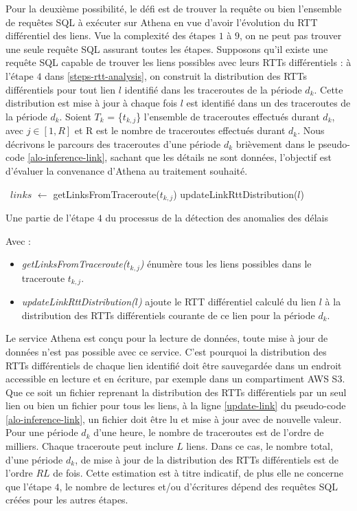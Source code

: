 Pour la deuxième possibilité, le défi est de trouver la requête ou bien l'ensemble de requêtes SQL à exécuter sur Athena en vue d'avoir l'évolution du RTT différentiel des liens. 
Vue la complexité des  étapes $1$ à $9$, on ne peut pas trouver une seule requête SQL assurant toutes les étapes. Supposons qu'il existe une requête SQL capable de trouver les liens possibles avec leurs RTTs différentiels : à l'étape $ 4 $ dans \ref{steps-rtt-analysis}, on construit la distribution des RTTs différentiels pour tout lien $l$ identifié dans les traceroutes de la période $d_k$. Cette distribution est mise à jour à chaque fois $l$ est identifié dans un des traceroutes  de la période $d_k$. Soient  $T_k$ = \{$t_{k, j}$\}  l'ensemble de traceroutes effectués durant $d_k$, avec $j \in [1, R]$ et R est le nombre de traceroutes effectués durant $d_k$. Nous décrivons le parcours des traceroutes d'une période $d_k$ brièvement dans le pseudo-code \ref{alo-inference-link}, sachant que les détails ne sont données, l'objectif est d'évaluer la convenance d'Athena au traitement souhaité.
\begin{algorithm}[H]
\begin{algorithmic}[1]
	  \
	  \State $links$ $\leftarrow$ getLinksFromTraceroute($t_{k, j}$)
	  	 		\State updateLinkRttDistribution($l$) \label{update-link}
	  	 \EndFor
	 \EndFor
\end{algorithmic}
\caption{Une partie de l'étape $4$ du processus de la détection des anomalies des délais }
\label{alo-inference-link}
\end{algorithm}

Avec : 
\begin{itemize}
	\item \textit{getLinksFromTraceroute($t_{k, j}$)} énumère tous les liens possibles dans le traceroute $t_{k, j}$.

    \item \textit{updateLinkRttDistribution($l$)} ajoute le RTT différentiel calculé du lien $l$ à la distribution des RTTs différentiels courante de ce lien pour la période $d_k$.
\end{itemize}


Le service Athena est conçu pour la lecture de données, toute mise à jour de données n'est pas possible avec ce service. C'est pourquoi la distribution des RTTs différentiels de chaque  lien identifié doit être sauvegardée dans un endroit accessible en lecture et en écriture, par exemple dans un compartiment AWS S3. Que ce soit un fichier reprenant la distribution des RTTs différentiels  par un seul lien ou bien un fichier pour tous les liens,   à la ligne  \ref{update-link} du pseudo-code \ref{alo-inference-link}, un fichier doit être lu et mise à jour avec de nouvelle valeur. Pour une période $d_k$ d'une heure, le nombre de traceroutes est de l'ordre de milliers. Chaque traceroute peut inclure $L$ liens. Dans ce cas, le nombre total, d'une période $d_k$, de mise à jour de la distribution des RTTs différentiels est de l'ordre $R$\texttimes$L$ de fois.  Cette estimation est à titre indicatif, de plus elle ne concerne que l'étape $4$, le nombre de lectures et/ou d'écritures dépend des requêtes SQL créées pour les autres étapes. 

